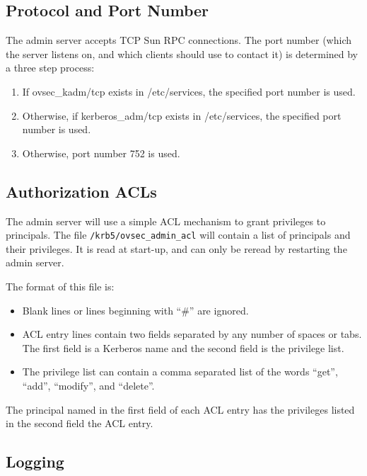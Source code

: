 \subsection{Protocol and Port Number}

The admin server accepts TCP Sun RPC connections.  The port number
(which the server listens on, and which clients should use to contact
it) is determined by a three step process:

\begin{enumerate}
\item If ovsec_kadm/tcp exists in /etc/services, the specified port
number is used.

\item Otherwise, if kerberos_adm/tcp exists in /etc/services, the
specified port number is used.

\item Otherwise, port number 752 is used.
\end{enumerate}

\subsection{Authorization ACLs}
\label{sec:acls}

The admin server will use a simple ACL mechanism to grant privileges
to principals.  The file {\tt /krb5/ovsec_admin_acl} will contain a
list of principals and their privileges.  It is read at start-up, and
can only be reread by restarting the admin server.

The format of this file is:

\begin{itemize}
\item Blank lines or lines beginning with ``\#'' are ignored.

\item ACL entry lines contain two fields separated by any number of
spaces or tabs.  The first field is a Kerberos name and the second
field is the privilege list.

\item The privilege list can contain a comma separated list of the
words ``get'', ``add'', ``modify'', and ``delete''.
\end{itemize}

The principal named in the first field of each ACL entry has the
privileges listed in the second field the ACL entry.

\subsection{Logging}

